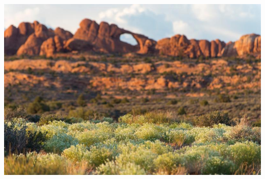 \begin{frame}

\centerline{\includegraphics[height=7in]{Figures/grass_landscape_arch.jpg}}

\end{frame}

